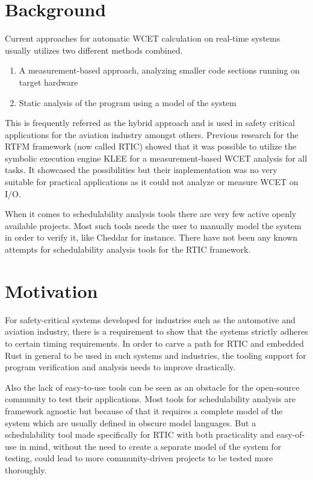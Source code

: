 \section{Background}
Current approaches for automatic WCET calculation on real-time systems usually
utilizes two different methods combined.
\begin{enumerate}
    \item A measurement-based approach, analyzing smaller code sections running
        on target hardware
    \item Static analysis of the program using a model of the system
\end{enumerate}
This is frequently referred as the hybrid approach and is used in safety
critical applications for the aviation industry\cite{rapita} amongst others.
Previous research for the RTFM framework (now called RTIC) showed that it was
possible to utilize the symbolic execution engine KLEE for a measurement-based
WCET analysis for all tasks\cite{lindner}. It showcased the possibilities but
their implementation was no very suitable for practical applications as it
could not analyze or measure WCET on I/O.

When it comes to schedulability analysis tools there are very few active openly
available projects. Most such tools needs the user to manually model the system
in order to verify it, like Cheddar\cite{cheddar} for instance. There have not
been any known attempts for schedulability analysis tools for the RTIC
framework.

\section{Motivation}
For safety-critical systems developed for industries such as the automotive and
aviation industry, there is a requirement to show that the systems strictly
adheres to certain timing requirements. In order to carve a path for RTIC and
embedded Rust in general to be used in such systems and industries, the tooling
support for program verification and analysis needs to improve drastically.

Also the lack of easy-to-use tools can be seen as an obstacle for the
open-source community to test their applications. Most tools for schedulability
analysis are framework agnostic but because of that it requires a complete
model of the system which are usually defined in obscure model languages. But a
schedulability tool made specifically for RTIC with both practicality and
easy-of-use in mind, without the need to create a separate model of the system
for testing, could lead to more community-driven projects to be tested more
thoroughly.

